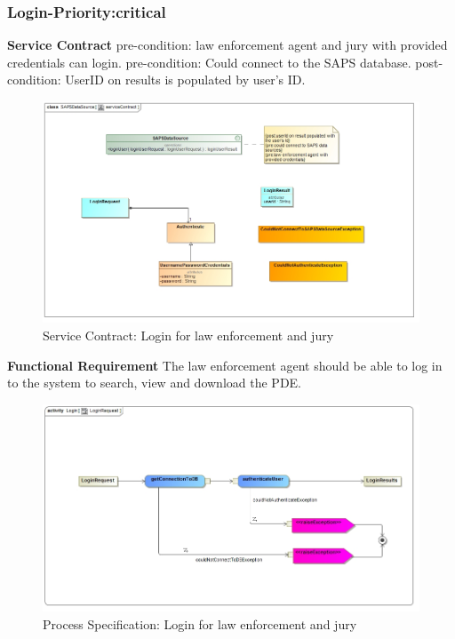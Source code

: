 \documentclass[a4paper,12pt]{article}
\begin{document}
\subsubsection{Login-Priority:critical}
\textbf{Service Contract}\newline
pre-condition: law enforcement agent and jury with provided credentials can login.\newline
pre-condition: Could connect to the SAPS database.\newline
post-condition: UserID on results is populated by user's ID.\newline
\begin{figure}[H]
\includegraphics[width=\textwidth]{images/SAPSserviceContract.jpg}
\caption{Service Contract: Login for law enforcement and jury\label{overflow}}
\end{figure}\newpage
\textbf{Functional Requirement}\newline
The law enforcement agent should be able to log in to the system to search, view and download the PDE.\newline
\begin{figure}[H]
\includegraphics[width=\textwidth]{images/LoginRequest.jpg}
\caption{Process Specification: Login for law enforcement and jury\label{overflow}}
\end{figure}
\end{document}

